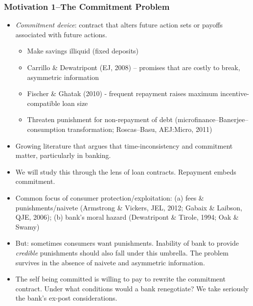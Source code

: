 \documentclass[11pt]{article}%
\providecommand{\DIFaddbegin}{} %
\providecommand{\DIFaddend}{} %
\providecommand{\DIFdelbegin}{} %
\providecommand{\DIFdelend}{} %
\begin{document}
\bigskip%

\DIFdelbegin %
\DIFdelend %
\DIFaddbegin \frametitle{Motivation 1--The Commitment Problem}%
\DIFaddend 


\begin{itemize}
\item \textit{Commitment device}: contract that alters future action sets or
payoffs associated with future actions.

\begin{itemize}
\item Make savings illiquid (fixed deposits)

\item Carrillo \& Dewatripont (EJ, 2008) -- promises that are costly to break,
asymmetric information

\item Fischer \& Ghatak (2010) - frequent repayment raises maximum
incentive-compatible loan size

\item Threaten punishment for non-repayment of debt
(microfinance--Banerjee--consumption transformation; Roscas--Basu, AEJ:Micro, 2011)
\end{itemize}

\item Growing literature that argues that time-inconsistency and commitment
matter, particularly in banking.

\item We will study this through the lens of loan contracts. Repayment embeds commitment.

\item Common focus of consumer protection/exploitation: (a) fees \&
punishments/naivete (Armstrong \& Vickers, JEL, 2012; Gabaix \& Laibson, QJE,
2006); (b) bank's moral hazard (Dewatripont \& Tirole, 1994; Oak \& Swamy)

\item But: sometimes consumers want punishments. Inability of bank to provide
\textit{credible} punishments should also fall under this umbrella. The
problem survives in the absence of naivete and asymmetric information.

\item The self being committed is willing to pay to rewrite the commitment
contract. Under what conditions would a bank renegotiate? We take seriously
the bank's ex-post considerations.
\end{itemize}
\end{document}
